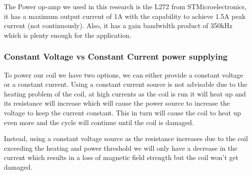 The Power op-amp we used in this research is the L272 from STMicroelectronics, it has a maximum output current of 1A with the capability to achieve 1.5A peak current (not continuously).
Also, it has a gain bandwidth product of 350kHz which is plenty enough for the application. \cite{L272}

\subsubsection{Constant Voltage vs Constant Current power supplying}
To power our coil we have two options, we can either provide a constant voltage or a constant current.
Using a constant current source is not advisable due to the heating problem of the coil, at high currents as the coil is run it will heat up and its resistance will increase which will cause the power source to increase the voltage to keep the current constant.
This in turn will cause the coil to heat up even more and the cycle will continue until the coil is damaged.

Instead, using a constant voltage source as the resistance increases due to the coil exceeding the heating and power threshold we will only have a decrease in the current which results in a loss of magnetic field strength but the coil won't get damaged.

